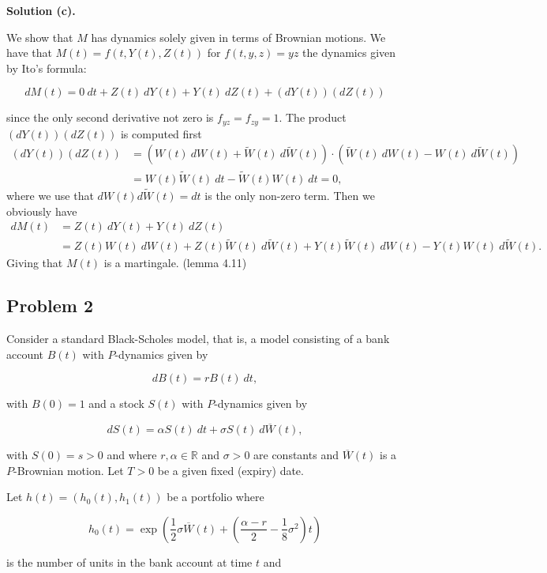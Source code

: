 \documentclass[a4paper,12pt,openany]{book}
\begin{document}
\textbf{Solution (c).}

We show that \(M\) has dynamics solely given in terms of Brownian motions. We have that \(M(t)=f(t,Y(t),Z(t))\) for \(f(t,y,z)=yz\) the dynamics given by Ito's formula:

\[
dM(t)=0\ dt+Z(t)\ dY(t)+Y(t)\ dZ(t)+(dY(t))(dZ(t))
\]

since the only second derivative not zero is \(f_{yz}=f_{zy}=1\). The product \((dY(t))(dZ(t))\) is computed first
\begin{align*}
(dY(t))(dZ(t))&=(W(t)\ dW(t)+\widetilde{W}(t)\ d\widetilde{W}(t))\cdot(\widetilde{W}(t)\ dW(t)-W(t)\ d\widetilde{W}(t))\\
&=W(t)\widetilde{W}(t)\ dt-\widetilde{W}(t)W(t)\ dt=0,
\end{align*}
where we use that \(dW(t)d\widetilde{W}(t)=dt\) is the only non-zero term. Then we obviously have
\begin{align*}
dM(t)&=Z(t)\ dY(t)+Y(t)\ dZ(t)\\
&=Z(t)W(t)\ dW(t)+Z(t)\widetilde{W}(t)\ d\widetilde{W}(t)+Y(t)\widetilde{W}(t)\ dW(t)-Y(t)W(t)\ d\widetilde{W}(t).
\end{align*}
Giving that \(M(t)\) is a martingale. (lemma 4.11)

\noindent\makebox[\linewidth]{\rule{\textwidth}{0.4pt}}

\hypertarget{problem-2-1}{%
\subsection{Problem 2}\label{problem-2-1}}

Consider a standard Black-Scholes model, that is, a model consisting of a bank account \(B(t)\) with \(P\)-dynamics given by

\[
dB(t)=rB(t)\ dt,
\]

with \(B(0)=1\) and a stock \(S(t)\) with \(P\)-dynamics given by

\[
dS(t)=\alpha S(t)\ dt+\sigma S(t)\ d\overline{W}(t),
\]

with \(S(0)=s>0\) and where \(r,\alpha\in\mathbb{R}\) and \(\sigma >0\) are constants and \(\overline{W}(t)\) is a \(P\)-Brownian motion. Let \(T>0\) be a given fixed (expiry) date.

Let \(h(t)=\left(h_0(t),h_1(t)\right)\) be a portfolio where

\[
h_0(t)=\exp\left(\frac{1}{2}\sigma\overline{W}(t)+\left(\frac{\alpha - r}{2}-\frac{1}{8}\sigma^2\right)t\right)
\]

is the number of units in the bank account at time \(t\) and
\end{document}
